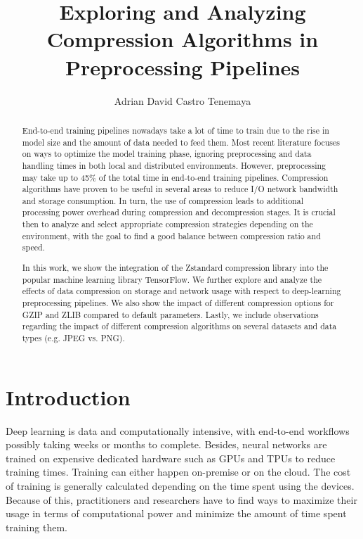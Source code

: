 \documentclass[sigconf,nonacm]{acmart}
\begin{document}
\title{Exploring and Analyzing Compression Algorithms in Preprocessing Pipelines}

\author{Adrian David Castro Tenemaya}

\begin{abstract}
  End-to-end training pipelines nowadays take a lot of time to train due to the rise in model size and the amount of data needed to feed them.
  Most recent literature focuses on ways to optimize the model training phase, ignoring preprocessing and data handling times in both local and distributed environments.
  However, preprocessing may take up to 45\% of the total time in end-to-end training pipelines.
  Compression algorithms have proven to be useful in several areas to reduce I/O network bandwidth and storage consumption.
  In turn, the use of compression leads to additional processing power overhead during compression and decompression stages.
  It is crucial then to analyze and select appropriate compression strategies depending on the environment, with the goal to find a good balance between compression ratio and speed.
  
  In this work, we show the integration of the Zstandard compression library into the popular machine learning library TensorFlow.
  We further explore and analyze the effects of data compression on storage and network usage with respect to deep-learning preprocessing pipelines.
  We also show the impact of different compression options for GZIP and ZLIB compared to default parameters.
  Lastly, we include observations regarding the impact of different compression algorithms on several datasets and data types (e.g. JPEG vs. PNG).
\end{abstract}

\maketitle

\section{Introduction}
Deep learning is data and computationally intensive, with end-to-end workflows possibly taking weeks or months to complete.
Besides, neural networks are trained on expensive dedicated hardware such as GPUs and TPUs to reduce training times.
Training can either happen on-premise or on the cloud.
The cost of training is generally calculated depending on the time spent using the devices.
Because of this, practitioners and researchers have to find ways to maximize their usage in terms of computational power and minimize the amount of time spent training them.
\end{document}
